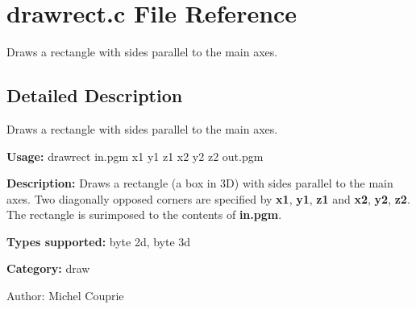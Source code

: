 \section{drawrect.c File Reference}
\label{drawrect_8c}
Draws a rectangle with sides parallel to the main axes.  




\label{_details}
\subsection{Detailed Description}
Draws a rectangle with sides parallel to the main axes. 

{\bf Usage:} drawrect in.pgm x1 y1 z1 x2 y2 z2 out.pgm

{\bf Description:} Draws a rectangle (a box in 3D) with sides parallel to the main axes. Two diagonally opposed corners are specified by {\bf x1}, {\bf y1}, {\bf z1} and {\bf x2}, {\bf y2}, {\bf z2}. The rectangle is surimposed to the contents of {\bf in.pgm}.

{\bf Types supported:} byte 2d, byte 3d

{\bf Category:} draw

\begin{Desc}
\item[Author:]Michel Couprie \end{Desc}
